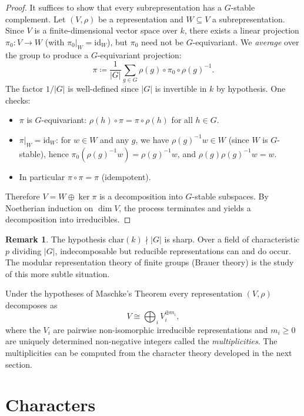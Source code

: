 \documentclass[12pt,a4paper]{amsart}
\theoremstyle{definition}
\newtheorem{remark}[theorem]{Remark}
\begin{document}
\begin{proof}
It suffices to show that every subrepresentation has a $G$-stable complement.
Let $(V,\rho)$ be a representation and $W \subseteq V$ a subrepresentation.
Since $V$ is a finite-dimensional vector space over $k$, there exists a linear
projection $\pi_0 \colon V \to W$ (with $\pi_0|_W = \mathrm{id}_W$), but $\pi_0$
need not be $G$-equivariant.  We \emph{average} over the group to produce a
$G$-equivariant projection:
\[
    \pi \coloneqq \frac{1}{|G|} \sum_{g \in G} \rho(g) \circ \pi_0 \circ \rho(g)^{-1}.
\]
The factor $1/|G|$ is well-defined since $|G|$ is invertible in $k$ by hypothesis.
One checks:
\begin{itemize}
  \item $\pi$ is $G$-equivariant: $\rho(h) \circ \pi = \pi \circ \rho(h)$ for all $h \in G$.
  \item $\pi|_W = \mathrm{id}_W$: for $w \in W$ and any $g$, we have $\rho(g)^{-1}w \in W$
        (since $W$ is $G$-stable), hence $\pi_0(\rho(g)^{-1}w) = \rho(g)^{-1}w$,
        and $\rho(g)\rho(g)^{-1}w = w$.
  \item In particular $\pi \circ \pi = \pi$ (idempotent).
\end{itemize}
Therefore $V = W \oplus \ker\pi$ is a decomposition into $G$-stable subspaces.
By Noetherian induction on $\dim V$, the process terminates and yields a
decomposition into irreducibles.
\end{proof}

\begin{remark}
The hypothesis $\mathrm{char}(k) \nmid |G|$ is sharp.  Over a field of
characteristic $p$ dividing $|G|$, indecomposable but reducible representations
can and do occur.  The modular representation theory of finite groups (Brauer
theory) is the study of this more subtle situation.
\end{remark}

Under the hypotheses of Maschke's Theorem every representation $(V,\rho)$
decomposes as
\[
    V \cong \bigoplus_{i} V_i^{\oplus m_i},
\]
where the $V_i$ are pairwise non-isomorphic irreducible representations and $m_i
\geq 0$ are uniquely determined non-negative integers called the
\emph{multiplicities}.  The multiplicities can be computed from the character
theory developed in the next section.

\section{Characters}
\label{sec:characters}
\end{document}
